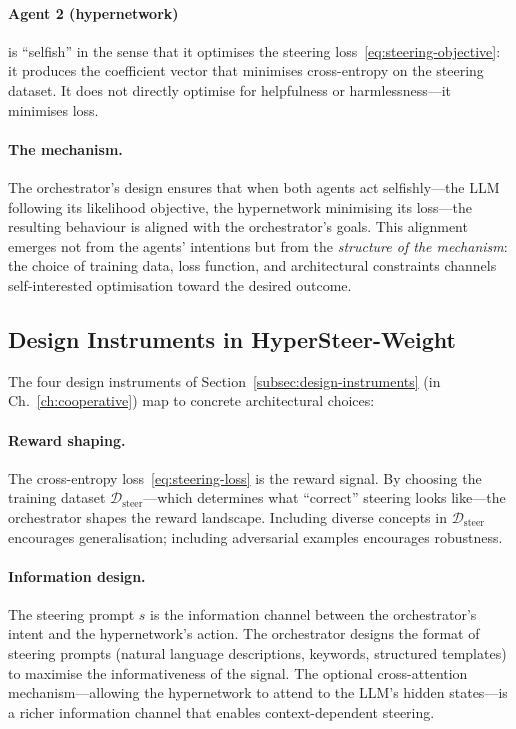 \paragraph{Agent 2 (hypernetwork)} is ``selfish'' in the sense that it optimises the steering loss~\eqref{eq:steering-objective}: it produces the coefficient vector that minimises cross-entropy on the steering dataset. It does not directly optimise for helpfulness or harmlessness---it minimises loss.

\paragraph{The mechanism.} The orchestrator's design ensures that when both agents act selfishly---the LLM following its likelihood objective, the hypernetwork minimising its loss---the resulting behaviour is aligned with the orchestrator's goals. This alignment emerges not from the agents' intentions but from the \emph{structure of the mechanism}: the choice of training data, loss function, and architectural constraints channels self-interested optimisation toward the desired outcome.

\subsection{Design Instruments in HyperSteer-Weight}
\label{subsec:design-instruments-hsw}

The four design instruments of Section~\ref{subsec:design-instruments} (in Ch.~\ref{ch:cooperative}) map to concrete architectural choices:

\paragraph{Reward shaping.} The cross-entropy loss~\eqref{eq:steering-loss} is the reward signal. By choosing the training dataset $\mathcal{D}_{\mathrm{steer}}$---which determines what ``correct'' steering looks like---the orchestrator shapes the reward landscape. Including diverse concepts in $\mathcal{D}_{\mathrm{steer}}$ encourages generalisation; including adversarial examples encourages robustness.

\paragraph{Information design.} The steering prompt $s$ is the information channel between the orchestrator's intent and the hypernetwork's action. The orchestrator designs the format of steering prompts (natural language descriptions, keywords, structured templates) to maximise the informativeness of the signal. The optional cross-attention mechanism---allowing the hypernetwork to attend to the LLM's hidden states---is a richer information channel that enables context-dependent steering.


